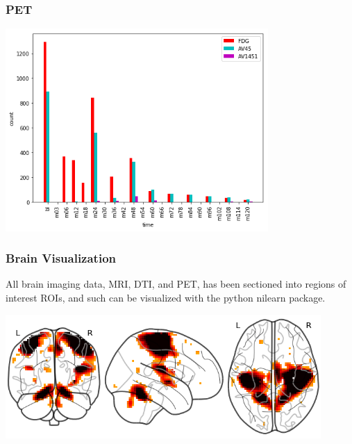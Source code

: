 \documentclass{beamer}
\begin{document}
    \begin{frame}
        \frametitle{PET}
        \begin{center}
            \includegraphics[width=0.75\textwidth]{images/pet_times.png}
        \end{center}
    \end{frame}

    \begin{frame}
        \frametitle{Brain Visualization}
        All brain imaging data, MRI, DTI, and PET, has been sectioned into regions of interest ROIs, and such can be visualized with the python nilearn package.\\
        \begin{center}
            \includegraphics[width=0.9\textwidth]{images/glass_brain.png}
        \end{center}
    \end{frame}
\end{document}
